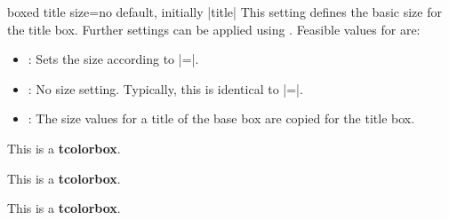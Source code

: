 \begin{docTcbKey}[][doc new=2016-02-26]{boxed title size}{=}{no default, initially |title|}
  This setting defines the basic size for the title box. Further settings
  can be applied using .
  Feasible values for  are:
  \begin{itemize}
  \item{}: Sets the size according to |=|.
  \item{}: No size setting. Typically, this is identical to
    |=|.
  \item{}: The size values for a title of the base box are copied
    for the title box.
  \end{itemize}

\begin{dispExample}
\begin{tcbraster}[raster columns=3,enhanced,boxrule=0.4pt,
    title=My title,attach boxed title to top center]
  \begin{tcolorbox}[boxed title size=title]
    This is a \textbf{tcolorbox}.
  \end{tcolorbox}
  \begin{tcolorbox}[boxed title size=standard]
    This is a \textbf{tcolorbox}.
  \end{tcolorbox}
  \begin{tcolorbox}[boxed title size=copy]
    This is a \textbf{tcolorbox}.
  \end{tcolorbox}
\end{tcbraster}
\end{dispExample}

\end{docTcbKey}


